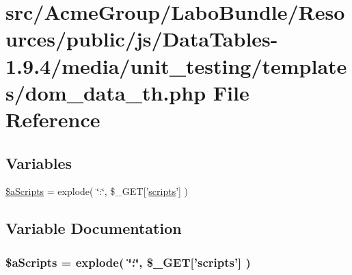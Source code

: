 \hypertarget{dom__data__th_8php}{\section{src/\+Acme\+Group/\+Labo\+Bundle/\+Resources/public/js/\+Data\+Tables-\/1.9.4/media/unit\+\_\+testing/templates/dom\+\_\+data\+\_\+th.php File Reference}
\label{dom__data__th_8php}
}
\subsection*{Variables}
\begin{DoxyCompactItemize}
\item 
\hyperlink{dom__data__th_8php_a3e8e1608000c9afdd05327fc2b06b056}{\$a\+Scripts} = explode( \char`\"{}\+:\char`\"{}, \$\+\_\+\+G\+E\+T\mbox{[}'\hyperlink{tinymce_8jquery_8dev_8js_a09066d4d580eeec222f858d588b4cdef}{scripts}'\mbox{]} )
\end{DoxyCompactItemize}


\subsection{Variable Documentation}
\hypertarget{dom__data__th_8php_a3e8e1608000c9afdd05327fc2b06b056}{
\subsubsection[{\$a\+Scripts}]{\setlength{\rightskip}{0pt plus 5cm}\$a\+Scripts = explode( \char`\"{}\+:\char`\"{}, \$\+\_\+\+G\+E\+T\mbox{[}'{\bf scripts}'\mbox{]} )}}\label{dom__data__th_8php_a3e8e1608000c9afdd05327fc2b06b056}
